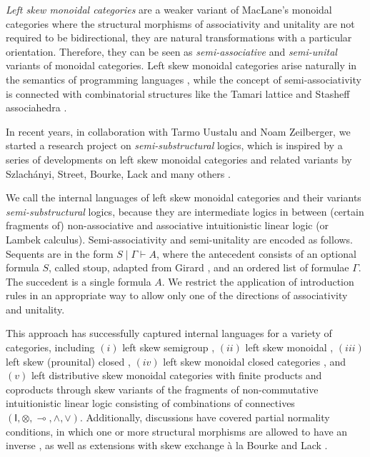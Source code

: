 \documentclass[submission,copyright,creativecommons]{eptcs}
\theoremstyle{definition}
\newcommand{\ot}{\otimes}
\newcommand{\lolli}{\multimap}
\newcommand{\I}{\mathsf{I}}
\begin{document}
\emph{Left skew monoidal categories} \cite{szlachanyi:skew-monoidal:2012} are a weaker variant of MacLane's monoidal categories where the structural morphisms of associativity and unitality are not required to be bidirectional, they are natural transformations with a particular orientation.
Therefore, they can be seen as \emph{semi-associative} and \emph{semi-unital} variants of monoidal categories. 
Left skew monoidal categories arise naturally in the semantics of programming languages \cite{altenkirch:monads:2014}, while the concept of semi-associativity is connected with combinatorial structures like the Tamari lattice and Stasheff associahedra \cite{zeilberger:semiassociative:19}.

In recent years, in collaboration with Tarmo Uustalu and Noam Zeilberger, we started a research project on \emph{semi-substructural} logics, which is inspired by a series of developments on left skew monoidal categories and related variants by Szlach{\'a}nyi, Street, Bourke, Lack and many others \cite{szlachanyi:skew-monoidal:2012,street:skew-closed:2013,lack:triangulations:2014,bourke:skew:2018,bourke:lack:braided:2020}.

We call the internal languages of left skew monoidal categories and their variants \emph{semi-substructural} logics, because they are intermediate logics in between (certain fragments of) non-associative and associative intuitionistic linear logic (or Lambek calculus).
Semi-associativity and semi-unitality are encoded as follows.
Sequents are in the form $S \mid \Gamma \vdash A$, where the antecedent consists of an optional formula $S$, called stoup, adapted from Girard \cite{girard:constructive:91}, and an ordered list of formulae $\Gamma$.
The succedent is a single formula $A$.
We restrict the application of introduction rules in an appropriate way to allow only one of the directions of associativity and unitality.

This approach has successfully captured internal languages for a variety of categories, including  $(i)$ left skew semigroup \cite{zeilberger:semiassociative:19}, $(ii)$ left skew monoidal \cite{uustalu:sequent:2021}, $(iii)$ left skew (prounital) closed \cite{uustalu:deductive:nodate}, $(iv)$ left skew monoidal closed categories \cite{UVW:protsn,veltri:multifocus:23}, and $(v)$ left distributive skew monoidal categories with finite products and coproducts \cite{VW:2023} through skew variants of the fragments of non-commutative intuitionistic linear logic consisting of combinations of connectives $(\I,\ot,\lolli,\land,\lor)$.
Additionally, discussions have covered partial normality conditions, in which one or more structural morphisms are allowed to have an inverse \cite{uustalu:proof:nodate}, as well as extensions with skew exchange à la Bourke and Lack \cite{veltri:coherence:2021,VW:2023}.
\end{document}
